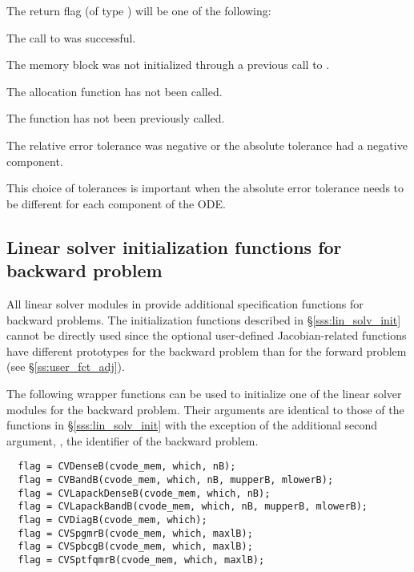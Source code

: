{
  The return flag  (of type ) will be one of the following:
  \begin{args}
  \item[\Id{CV\_SUCCESS}]
    The call to  was successful.
  \item[\Id{CV\_MEM\_NULL}] 
    The {\cvodes} memory block was not initialized through a previous call to
    .
  \item[\Id{CV\_NO\_MALLOC}] 
    The allocation function  has not been called.
  \item[\Id{CV\_NO\_ADJ}]
    The function  has not been previously called.
  \item[\Id{CV\_ILL\_INPUT}] 
    The relative error tolerance was negative or the absolute tolerance
    had a negative component.
  \end{args}
}
{
  This choice of tolerances is important when the absolute error tolerance needs to
  be different for each component of the ODE. 
}

\subsection{Linear solver initialization functions for backward problem}
\label{sss:lin_solv_b}

All linear solver modules in {\cvodes} provide additional specification functions 
for backward problems.
The initialization functions described in \S\ref{sss:lin_solv_init} cannot be directly used 
since the optional user-defined Jacobian-related functions have different prototypes for the
backward problem than for the forward problem (see \S\ref{ss:user_fct_adj}).

The following wrapper functions can be used to initialize one of the linear
solver modules for the backward problem. Their arguments are identical to those
of the functions in \S\ref{sss:lin_solv_init} with the exception of the additional
second argument, , the identifier of the backward problem.
\begin{verbatim}
  flag = CVDenseB(cvode_mem, which, nB);
  flag = CVBandB(cvode_mem, which, nB, mupperB, mlowerB);
  flag = CVLapackDenseB(cvode_mem, which, nB);
  flag = CVLapackBandB(cvode_mem, which, nB, mupperB, mlowerB);
  flag = CVDiagB(cvode_mem, which);
  flag = CVSpgmrB(cvode_mem, which, maxlB);
  flag = CVSpbcgB(cvode_mem, which, maxlB);
  flag = CVSptfqmrB(cvode_mem, which, maxlB);
\end{verbatim}

